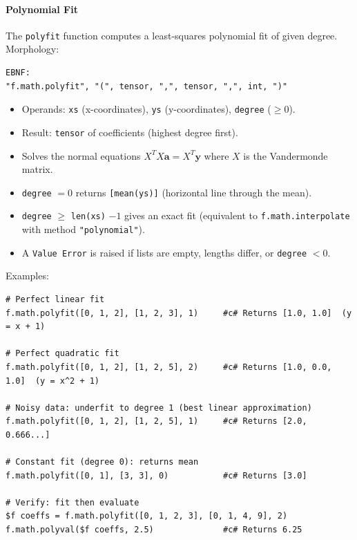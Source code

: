 \paragraph{Polynomial Fit}
The \texttt{polyfit} function computes a least-squares polynomial fit of given degree. \\ Morphology:
\begin{verbatim}
EBNF:
"f.math.polyfit", "(", tensor, ",", tensor, ",", int, ")"
\end{verbatim}
\begin{itemize}
\item Operands: \texttt{xs} (x-coordinates), \texttt{ys} (y-coordinates), \texttt{degree} ($\geq 0$).
\item Result: \texttt{tensor} of coefficients (highest degree first).
\item Solves the normal equations $X^T X \mathbf{a} = X^T \mathbf{y}$ where $X$ is the Vandermonde matrix.
\item \texttt{degree} $= 0$ returns \texttt{[mean(ys)]} (horizontal line through the mean).
\item \texttt{degree} $\geq$ \texttt{len(xs)} $- 1$ gives an exact fit (equivalent to \texttt{f.math.interpolate} with method \texttt{"polynomial"}).
\item A \texttt{Value Error} is raised if lists are empty, lengths differ, or \texttt{degree} $< 0$.
\end{itemize}
Examples:
\begin{verbatim}
# Perfect linear fit
f.math.polyfit([0, 1, 2], [1, 2, 3], 1)     #c# Returns [1.0, 1.0]  (y = x + 1)

# Perfect quadratic fit
f.math.polyfit([0, 1, 2], [1, 2, 5], 2)     #c# Returns [1.0, 0.0, 1.0]  (y = x^2 + 1)

# Noisy data: underfit to degree 1 (best linear approximation)
f.math.polyfit([0, 1, 2], [1, 2, 5], 1)     #c# Returns [2.0, 0.666...]

# Constant fit (degree 0): returns mean
f.math.polyfit([0, 1], [3, 3], 0)           #c# Returns [3.0]

# Verify: fit then evaluate
$f coeffs = f.math.polyfit([0, 1, 2, 3], [0, 1, 4, 9], 2)
f.math.polyval($f coeffs, 2.5)              #c# Returns 6.25
\end{verbatim}

